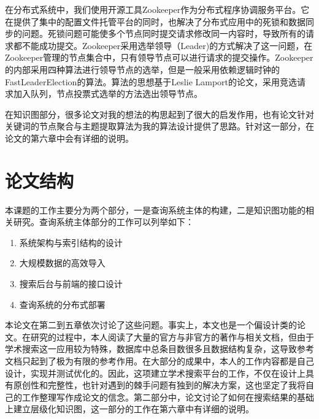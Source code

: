 在分布式系统中，我们使用开源工具Zookeeper作为分布式程序协调服务平台。它在提供了集中的配置文件托管平台的同时，也解决了分布式应用中的死锁和数据同步的问题。死锁问题可能使多个节点同时提交请求修改同一内容时，导致所有的请求都不能成功提交。Zookeeper采用选举领导（Leader)的方式解决了这一问题，在Zookeeper管理的节点集合中，只有领导节点可以进行请求的提交操作。Zookeeper的内部采用四种算法进行领导节点的选举，但是一般采用依赖逻辑时钟的FastLeaderElection的算法。算法的思想基于Leslie Lamport的论文，采用竞选请求加入队列，节点投票式选举的方法选出领导节点。

在知识图部分，很多论文对我的想法的构思起到了很大的启发作用，也有论文针对关键词的节点聚合与主题提取算法为我的算法设计提供了思路。针对这一部分，在论文的第六章中会有详细的说明。

\section{论文结构}
本课题的工作主要分为两个部分，一是查询系统主体的构建，二是知识图功能的相关研究。查询系统主体部分的工作可以列举如下：

\begin{enumerate}
  \item 系统架构与索引结构的设计
  \item 大规模数据的高效导入
  \item 搜索后台与前端的接口设计
  \item 查询系统的分布式部署
\end{enumerate}

本论文在第二到五章依次讨论了这些问题。事实上，本文也是一个偏设计类的论文。在研究的过程中，本人阅读了大量的官方与非官方的著作与相关文档，但由于学术搜索这一应用较为特殊，数据库中总条目数很多且数据结构复杂，这导致参考文档只起到了极为有限的参考作用。在大部分的成果中，本人的工作内容都是自己设计，实现并测试优化的。因此，这项建立学术搜索平台的工作，不仅在设计上具有原创性和完整性，也针对遇到的棘手问题有独到的解决方案，这也坚定了我将自己的工作整理写作成论文的信念。第二部分中，论文讨论了如何在搜索结果的基础上建立层级化知识图，这一部分的工作在第六章中有详细的说明。